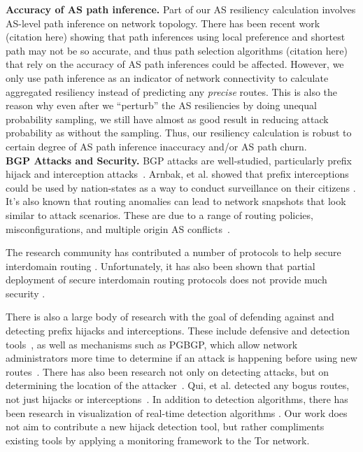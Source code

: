{\bf Accuracy of AS path inference.}  
Part of our AS resiliency calculation involves AS-level path inference on network topology. There has been recent work (citation here) showing that path inferences using local preference and shortest path may not be so accurate, and thus path selection algorithms (citation here) that rely on the accuracy of AS path inferences could be affected. However, we only use path inference as an indicator of network connectivity to calculate aggregated resiliency instead of predicting any \emph{precise} routes. This is also the reason why even after we ``perturb'' the AS resiliencies by doing unequal probability sampling, we still have almost as good result in reducing attack probability as without the sampling. Thus, our resiliency calculation is robust to certain degree of AS path inference inaccuracy and/or AS path churn. 
\\
{\bf BGP Attacks and Security.}
BGP attacks are well-studied, particularly prefix hijack and interception attacks~\cite{ballani2007study, mcarthur2009stealthy, zhang2012studying}.  Arnbak, et al. showed that prefix interceptions could be used by nation-states as a way to conduct surveillance on their citizens \cite{arnbak2014loopholes}.  It's also known that routing anomalies can lead to network snapshots that look similar to attack scenarios.  These are due to a range of routing policies, misconfigurations, and multiple origin AS conflicts~\cite{caesar2005bgp, mahajan2002understanding, zhao2001analysis}.  

The research community has contributed a number of protocols to help secure interdomain routing \cite{boldyreva2012provable, chan2006modeling, gill2011let, hu2004spv, zhang2009hc, van2007interdomain}.  Unfortunately, it has also been shown that partial deployment of secure interdomain routing protocols does not provide much security \cite{lychev2013bgp}.

There is also a large body of research with the goal of defending against and detecting prefix hijacks and interceptions.  These include defensive and detection tools~\cite{lad2006phas, hu2007accurate, shi2012detecting, zhang2008ispy, zheng2007light, sriram2009comparative, zhang2007practical}, as well as mechanisms such as PGBGP, which allow network administrators more time to determine if an attack is happening before using new routes~\cite{karlin2006pretty}.  There has also been research not only on detecting attacks, but on determining the location of the attacker~\cite{qiu2009locating}.  Qui, et al. detected any bogus routes, not just hijacks or interceptions~\cite{qiu2007detecting}.  In addition to detection algorithms, there has been research in visualization of real-time detection algorithms \cite{teoh2006bgp}.  Our work does not aim to contribute a new hijack detection tool, but rather compliments existing tools by applying a monitoring framework to the Tor network. 




